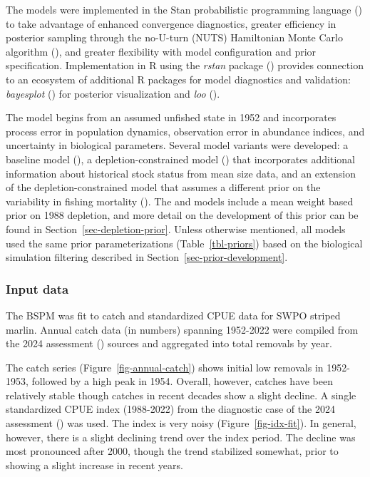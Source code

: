 \documentclass[
  11pt,
]{SCreport}
\begin{document}
The models were implemented in the Stan probabilistic programming
language ()
to take advantage of enhanced convergence diagnostics, greater
efficiency in posterior sampling through the no-U-turn (NUTS)
Hamiltonian Monte Carlo algorithm
(), and greater flexibility with model configuration and prior
specification. Implementation in R using the \emph{rstan} package
() provides
connection to an ecosystem of additional R packages for model
diagnostics and validation: \emph{bayesplot}
() for posterior
visualization and \emph{loo} ().

The model begins from an assumed unfished state in 1952 and incorporates
process error in population dynamics, observation error in abundance
indices, and uncertainty in biological parameters. Several model
variants were developed: a baseline model
(), a depletion-constrained model
() that incorporates additional
information about historical stock status from mean size data, and an
extension of the depletion-constrained model that assumes a different
prior on the variability in fishing mortality
(). The
 and 
models include a mean weight based prior on 1988 depletion, and more
detail on the development of this prior can be found in
Section~\ref{sec-depletion-prior}. Unless otherwise mentioned, all
models used the same prior parameterizations (Table~\ref{tbl-priors})
based on the biological simulation filtering described in
Section~\ref{sec-prior-development}.

\subsubsection{Input data}\label{sec-input-data}

The BSPM was fit to catch and standardized CPUE data for SWPO striped
marlin. Annual catch data (in numbers) spanning 1952-2022 were compiled
from the 2024 assessment
() sources and aggregated into total removals by year.

The catch series (Figure~\ref{fig-annual-catch}) shows initial low
removals in 1952-1953, followed by a high peak in 1954. Overall,
however, catches have been relatively stable though catches in recent
decades show a slight decline. A single standardized CPUE index
(1988-2022) from the diagnostic case of the 2024 assessment
() was used. The index is very noisy (Figure~\ref{fig-idx-fit}). In
general, however, there is a slight declining trend over the index
period. The decline was most pronounced after 2000, though the trend
stabilized somewhat, prior to showing a slight increase in recent years.
\end{document}
